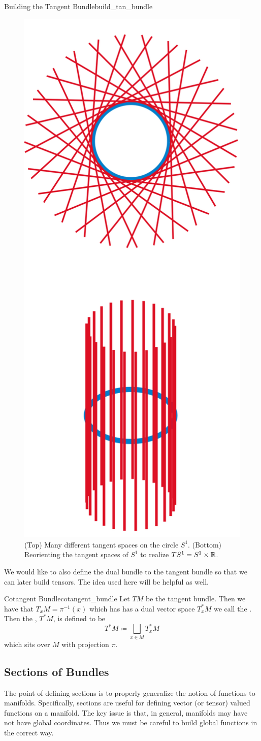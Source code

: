 \begin{fig}{Building the Tangent Bundle}{build_tan_bundle}
\begin{figure}[H]
    \centering
    \includegraphics[width=.3\textwidth]{s^1_tangent_bundle.png}
    \caption{(Top) Many different tangent spaces on the circle $S^1$. (Bottom) Reorienting the tangent spaces of $S^1$ to realize $TS^1=S^1\times \mathbb{R}$.}
    \label{fig:tangent_bundle}
\end{figure}
\end{fig}

We would like to also define the dual bundle to the tangent bundle so that we can later build tensors.  The idea used here will be helpful as well.

\begin{df}{Cotangent Bundle}{cotangent_bundle}
Let $TM$ be the tangent bundle.  Then we have that $T_xM=\pi^{-1}(x)$ which has has a dual vector space $T_x^*M$ we call the .  Then the , $T^*M$, is defined to be
\[
T^*M \coloneqq \bigsqcup_{x\in M} T_x^*M
\]
which sits over $M$ with projection $\pi$. 
\end{df}

\subsection{Sections of Bundles}
The point of defining sections is to properly generalize the notion of functions to manifolds. Specifically, sections are useful for defining vector (or tensor) valued functions on a manifold. The key issue is that, in general, manifolds may have not have global coordinates.  Thus we must be careful to build global functions in the correct way.

